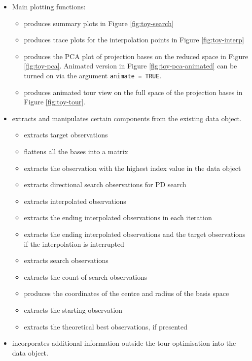 \begin{itemize}
\item
  Main plotting functions:

  \begin{itemize}
  \tightlist
  \item
     produces summary plots in Figure
    \ref{fig:toy-search}
  \item
    produces trace plots for the
    interpolation points in Figure \ref{fig:toy-interp}
  \item
     produces the PCA plot of projection
    bases on the reduced space in Figure \ref{fig:toy-pca}. Animated
    version in Figure \ref{fig:toy-pca-animated} can be turned on via
    the argument \texttt{animate\ =\ TRUE}.
  \item
     produces animated tour view on the
    full space of the projection bases in Figure \ref{fig:toy-tour}.
  \end{itemize}
\item
   extracts and manipulates certain components from the
  existing data object.

  \begin{itemize}
  \tightlist
  \item
     extracts target observations
  \item
     flattens all the bases into a matrix
  \item
     extracts the observation with the highest index
    value in the data object
  \item
     extracts directional search observations
    for PD search
  \item
     extracts interpolated observations
  \item
     extracts the ending interpolated
    observations in each iteration
  \item
     extracts the ending interpolated
    observations and the target observations if the interpolation is
    interrupted
  \item
     extracts search observations
  \item
     extracts the count of search
    observations
  \item
     produces the coordinates of the centre
    and radius of the basis space
  \item
     extracts the starting observation
  \item
     extracts the theoretical best observations, if
    presented
  \end{itemize}
\item
   incorporates additional information outside the tour
  optimisation into the data object.


\end{itemize}
